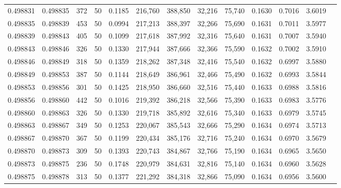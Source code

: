 \begin{tabular}{rrrrrrrrrrrrr}
0.498831 & 0.498835 & 372 &  50 &                                     0.1185 & 216,760 & 388,850 &  32,216 &  75,740 & 0.1630 & 0.7016 & 3.6019 \\
0.498835 & 0.498839 & 453 &  50 &                                     0.0994 & 217,213 & 388,397 &  32,266 &  75,690 & 0.1631 & 0.7011 & 3.5977 \\
0.498839 & 0.498843 & 405 &  50 &                                     0.1099 & 217,618 & 387,992 &  32,316 &  75,640 & 0.1631 & 0.7007 & 3.5940 \\
0.498843 & 0.498846 & 326 &  50 &                                     0.1330 & 217,944 & 387,666 &  32,366 &  75,590 & 0.1632 & 0.7002 & 3.5910 \\
0.498846 & 0.498849 & 318 &  50 &                                     0.1359 & 218,262 & 387,348 &  32,416 &  75,540 & 0.1632 & 0.6997 & 3.5880 \\
0.498849 & 0.498853 & 387 &  50 &                                     0.1144 & 218,649 & 386,961 &  32,466 &  75,490 & 0.1632 & 0.6993 & 3.5844 \\
0.498853 & 0.498856 & 301 &  50 &                                     0.1425 & 218,950 & 386,660 &  32,516 &  75,440 & 0.1633 & 0.6988 & 3.5816 \\
0.498856 & 0.498860 & 442 &  50 &                                     0.1016 & 219,392 & 386,218 &  32,566 &  75,390 & 0.1633 & 0.6983 & 3.5776 \\
0.498860 & 0.498863 & 326 &  50 &                                     0.1330 & 219,718 & 385,892 &  32,616 &  75,340 & 0.1633 & 0.6979 & 3.5745 \\
0.498863 & 0.498867 & 349 &  50 &                                     0.1253 & 220,067 & 385,543 &  32,666 &  75,290 & 0.1634 & 0.6974 & 3.5713 \\
0.498867 & 0.498870 & 367 &  50 &                                     0.1199 & 220,434 & 385,176 &  32,716 &  75,240 & 0.1634 & 0.6970 & 3.5679 \\
0.498870 & 0.498873 & 309 &  50 &                                     0.1393 & 220,743 & 384,867 &  32,766 &  75,190 & 0.1634 & 0.6965 & 3.5650 \\
0.498873 & 0.498875 & 236 &  50 &                                     0.1748 & 220,979 & 384,631 &  32,816 &  75,140 & 0.1634 & 0.6960 & 3.5628 \\
0.498875 & 0.498878 & 313 &  50 &                                     0.1377 & 221,292 & 384,318 &  32,866 &  75,090 & 0.1634 & 0.6956 & 3.5600 \\

\end{tabular}
